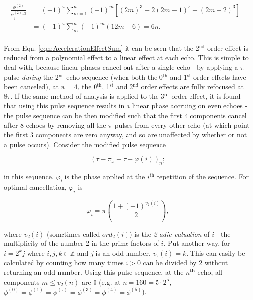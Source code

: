 \documentclass[PaulGanssle-Thesis.tex]{subfiles}
\begin{document}
\begin{align}
\frac{\phi^{(2)}}{\alpha_{j}^{(2)}\tau^3} & = \left(-1\right)^{n}\sum_{m=1}^{n}(-1)^{m}\left[\left(2m\right)^3 - 2\left(2m-1\right)^3 + \left(2m-2\right)^3\right] & \nonumber \\
&  = (-1)^{n}\sum_{m}^{n}\left(-1\right)^{m}\left(12m-6\right) = 6n. & \\
\label{eqn:AccelerationEffectSum}
\end{align} 

From Eqn. \ref{eqn:AccelerationEffectSum} it can be seen that the 2$^{\textrm{nd}}$ order effect is reduced from a polynomial effect to a linear effect at each echo. This is simple to deal with, because linear phases cancel out after a single echo - by applying a $\pi$ pulse \textit{during} the 2$^{\textrm{nd}}$ echo sequence (when both the 0$^{\textrm{th}}$ and 1$^{\textrm{st}}$ order effects have been canceled), at $n = 4$, the 0$^{\textrm{th}}$, 1$^{\textrm{st}}$ and 2$^{\textrm{nd}}$ order effects are fully refocused at $8\tau$. If the same method of analysis is applied to the 3$^{\textrm{rd}}$ order effect, it is found that using this pulse sequence results in a linear phase accruing on even echoes - the pulse sequence can be then modified such that the first 4 components cancel after 8 echoes by removing all the $\pi$ pulses from every other echo (at which point the first 3 components are zero anyway, and so are unaffected by whether or not a pulse occurs). Consider the modified pulse sequence

\begin{equation}
\label{eqn:ModifiedCPMGPulseSequence}
(\tau - \pi_{x} - \tau - \varphi(i))_{n};
\end{equation}

in this sequence, $\varphi_{i}$ is the phase applied at the $i^{\mathrm{th}}$ repetition of the sequence. For optimal cancellation, $\varphi_{i}$ is

\begin{equation}
\label{eqn:2adicvaluationpulses}
\varphi_{i} = \pi\left(\frac{1+(-1)^{v_{2}(i)}}{2}\right),
\end{equation}

where $v_{2}(i)$ (sometimes called $ord_{2}(i)$) is the \textit{2-adic valuation} of $i$ - the multiplicity of the number 2 in the prime factors of $i$. Put another way, for $i = 2^{k}j$ where $i, j, k \in \mathbb{Z}$ and $j$ is an odd number, $v_{2}(i) = k$. This can easily be calculated by counting how many times $i > 0$ can be divided by 2 without returning an odd number. Using this pulse sequence, at the $n^{\mathbf{th}}$ echo, all components $m \leq v_{2}(n)$ are 0 (e.g. at $n = 160 = 5\cdot2^{5}$, $\phi^{(0)} = \phi^{(1)} = \phi^{(2)} = \phi^{(3)} = \phi^{(4)} = \phi^{(5)}$).
\end{document}
